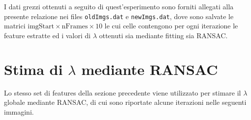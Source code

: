 \documentclass[12pt]{report}
\begin{document}
\noindent I dati grezzi ottenuti a seguito di quest'esperimento sono forniti allegati alla presente relazione nei files \verb|oldImgs.dat| e \verb|newImgs.dat|, dove sono salvate le matrici $\text{imgStart} \times \text{nFrames} \times 10$ le cui celle contengono per ogni iterazione le feature estratte ed i valori di $\lambda$ ottenuti sia mediante fitting sia RANSAC. \\


\newpage
\section{Stima di $\lambda$ mediante RANSAC}
\label{ransactest}

\noindent Lo stesso set di features della sezione precedente viene utilizzato per stimare il $\lambda$ globale mediante RANSAC, di cui sono riportate alcune iterazioni nelle seguenti immagini.
\end{document}
